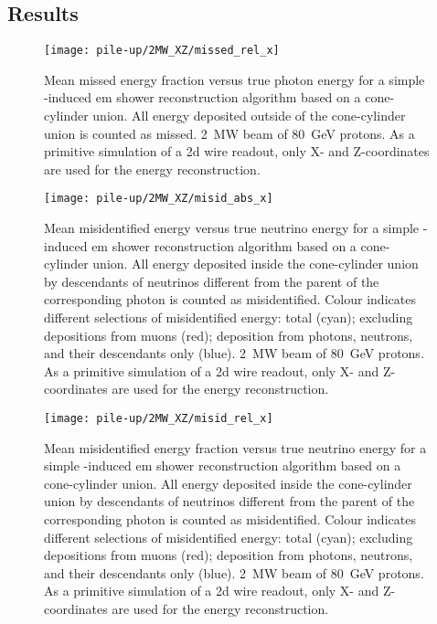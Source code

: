 \subsection{Results}
\label{sec:dune-nd_pile-up_results}

\begin{figure}[htb]
	\centering
	\texttt{[image: pile-up/2MW\_XZ/missed\_rel\_x]}
	\caption[Pile-up study mean missed fractional vs.\ true photon energy, \SI{2}{\mega\watt} beam, XZ projection]{%
		Mean missed energy fraction versus true photon energy for a simple \Pgpz-induced \acrshort{em} shower reconstruction algorithm based on a cone-cylinder union.
		All energy deposited outside of the cone-cylinder union is counted as missed.
		\SI{2}{\mega\watt} beam of \SI{80}{\giga\electronvolt} protons.
		As a primitive simulation of a \acrshort{2d} wire readout, only X- and Z-coordinates are used for the energy reconstruction.
	}
	\label{fig:dune-nd_2MW-XZ_missed-rel-x}
\end{figure}

\begin{figure}[htb]
	\centering
	\texttt{[image: pile-up/2MW\_XZ/misid\_abs\_x]}
	\caption[Pile-up study mean misidentified vs.\ true neutrino energy, \SI{2}{\mega\watt} beam, XZ projection]{%
		Mean misidentified energy versus true neutrino energy for a simple \Pgpz-induced \acrshort{em} shower reconstruction algorithm based on a cone-cylinder union.
		All energy deposited inside the cone-cylinder union by descendants of neutrinos different from the parent of the corresponding \Pgpz photon is counted as misidentified.
		Colour indicates different selections of misidentified energy: total (cyan); excluding depositions from muons (red); deposition from photons, neutrons, and their descendants only (blue).
		\SI{2}{\mega\watt} beam of \SI{80}{\giga\electronvolt} protons.
		As a primitive simulation of a \acrshort{2d} wire readout, only X- and Z-coordinates are used for the energy reconstruction.
	}
	\label{fig:dune-nd_2MW-XZ_misid-abs-x}
\end{figure}

\begin{figure}[htb]
	\centering
	\texttt{[image: pile-up/2MW\_XZ/misid\_rel\_x]}
	\caption[Pile-up study mean misidentified fractional vs.\ true neutrino energy, \SI{2}{\mega\watt} beam, XZ projection]{%
		Mean misidentified energy fraction versus true neutrino energy for a simple \Pgpz-induced \acrshort{em} shower reconstruction algorithm based on a cone-cylinder union.
		All energy deposited inside the cone-cylinder union by descendants of neutrinos different from the parent of the corresponding \Pgpz photon is counted as misidentified.
		Colour indicates different selections of misidentified energy: total (cyan); excluding depositions from muons (red); deposition from photons, neutrons, and their descendants only (blue).
		\SI{2}{\mega\watt} beam of \SI{80}{\giga\electronvolt} protons.
		As a primitive simulation of a \acrshort{2d} wire readout, only X- and Z-coordinates are used for the energy reconstruction.
	}
	\label{fig:dune-nd_2MW-XZ_misid-rel-x}
\end{figure}

